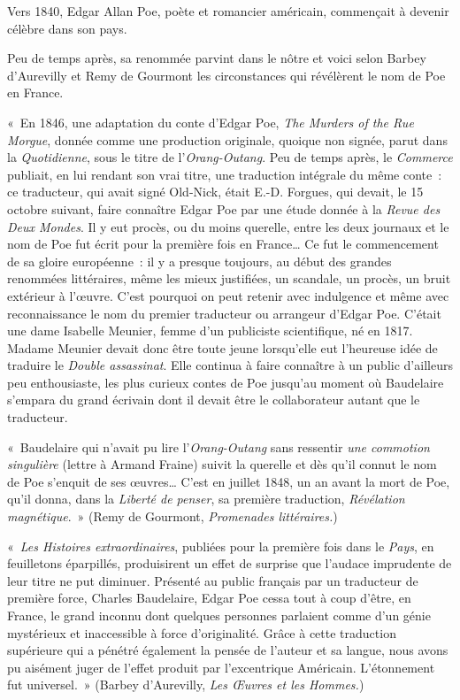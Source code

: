 \documentclass[french,twoside]{book} %
\begin{document}
\noindent Vers 1840, Edgar Allan Poe, poète et romancier américain, commençait à devenir célèbre dans son pays.\par
Peu de temps après, sa renommée parvint dans le nôtre et voici selon Barbey d’Aurevilly et Remy de Gourmont les circonstances qui révélèrent le nom de Poe en France.\par
« En 1846, une adaptation du conte d’Edgar Poe, \emph{The Murders of the Rue Morgue}, donnée comme une production originale, quoique non signée, parut dans la \emph{Quotidienne}, sous le titre de l’\emph{Orang-Outang}. Peu de temps après, le \emph{Commerce} publiait, en lui rendant son vrai titre, une traduction intégrale du même conte : ce traducteur, qui avait signé Old-Nick, était E.-D. Forgues, qui devait, le 15 octobre suivant, faire connaître Edgar Poe par une étude donnée à la \emph{Revue des Deux Mondes}. Il y eut procès, ou du moins querelle, entre les deux journaux et le nom de Poe fut écrit pour la première fois en France… Ce fut le commencement de sa gloire européenne : il y a presque toujours, au début des grandes renommées littéraires, même les mieux justifiées, un scandale, un procès, un bruit extérieur à l’œuvre. C’est pourquoi on peut retenir avec indulgence et même avec reconnaissance le nom du premier traducteur ou arrangeur d’Edgar Poe. C’était une dame Isabelle Meunier, femme d’un publiciste scientifique, né en 1817. Madame Meunier devait donc être toute jeune lorsqu’elle eut l’heureuse idée de traduire le \emph{Double assassinat}. Elle continua à faire connaître à un public d’ailleurs peu enthousiaste, les plus curieux contes de Poe jusqu’au moment où Baudelaire s’empara du grand écrivain dont il devait être le collaborateur autant que le traducteur.\par
« Baudelaire qui n’avait pu lire l’\emph{Orang-Outang} sans ressentir \emph{une commotion singulière} (lettre à Armand Fraine) suivit la querelle et dès qu’il connut le nom de Poe s’enquit de ses œuvres… C’est en juillet 1848, un an avant la mort de Poe, qu’il donna, dans la \emph{Liberté de penser}, sa première traduction, \emph{Révélation magnétique}. » (Remy de Gourmont, \emph{Promenades littéraires.})\par
« \emph{Les Histoires extraordinaires}, publiées pour la première fois dans le \emph{Pays}, en feuilletons éparpillés, produisirent un effet de surprise que l’audace imprudente de leur titre ne put diminuer. Présenté au public français par un traducteur de première force, Charles Baudelaire, Edgar Poe cessa tout à coup d’être, en France, le grand inconnu dont quelques personnes parlaient comme d’un génie mystérieux et inaccessible à force d’originalité. Grâce à cette traduction supérieure qui a pénétré également la pensée de l’auteur et sa langue, nous avons pu aisément juger de l’effet produit par l’excentrique Américain. L’étonnement fut universel. » (Barbey d’Aurevilly, \emph{Les Œuvres et les Hommes.})\par
\end{document}
